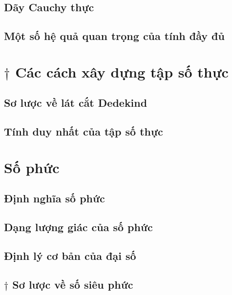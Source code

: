 \subsection*{Dãy Cauchy thực}

\subsection*{Một số hệ quả quan trọng của tính đầy đủ}

\section{$\dagger$ Các cách xây dựng tập số thực}

\subsection*{Sơ lược về lát cắt Dedekind}

\subsection*{Tính duy nhất của tập số thực}

\section{Số phức}

\subsection*{Định nghĩa số phức}

\subsection*{Dạng lượng giác của số phức}

\subsection*{Định lý cơ bản của đại số}

\subsection*{$\dagger$ Sơ lược về số siêu phức}

